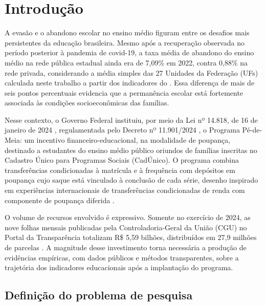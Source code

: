 
\chapter{Introdução}
\label{chap_introducao}

A evasão e o abandono escolar no ensino médio figuram entre os desafios mais persistentes da educação brasileira.
Mesmo após a recuperação observada no período posterior à pandemia de covid-19, a taxa média de abandono do ensino médio na rede pública estadual ainda era de 7,09\% em 2022, contra 0,88\% na rede privada, considerando a média simples das 27 Unidades da Federação (UFs) calculada neste trabalho a partir dos indicadores do .
Essa diferença de mais de seis pontos percentuais evidencia que a permanência escolar está fortemente associada às condições socioeconômicas das famílias.

Nesse contexto, o Governo Federal instituiu, por meio da Lei nº 14.818, de 16 de janeiro de 2024 \cite{Brasil2024Lei14818}, regulamentada pelo Decreto nº 11.901/2024 \cite{Brasil2024Decreto11901}, o Programa Pé-de-Meia: um incentivo financeiro-educacional, na modalidade de poupança, destinado a estudantes do ensino médio público oriundos de famílias inscritas no Cadastro Único para Programas Sociais (CadÚnico).
O programa combina transferências condicionadas à matrícula e à frequência com depósitos em poupança cujo saque está vinculado à conclusão de cada série, desenho inspirado em experiências internacionais de transferências condicionadas de renda com componente de poupança diferida \cite{Fiszbein2009,BarreraOsorio2011}.

O volume de recursos envolvido é expressivo.
Somente no exercício de 2024, as nove folhas mensais publicadas pela Controladoria-Geral da União (CGU) no Portal da Transparência totalizam R\$ 5,59 bilhões, distribuídos em 27,9 milhões de parcelas \cite{CGU2026PeDeMeia}.
A magnitude desse investimento torna necessária a produção de evidências empíricas, com dados públicos e métodos transparentes, sobre a trajetória dos indicadores educacionais após a implantação do programa.

\section{Definição do problema de pesquisa}
\label{sec_definicao_problema_pesquisa}

